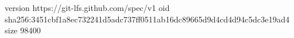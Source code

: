 version https://git-lfs.github.com/spec/v1
oid sha256:3451cbf1a8ec732241d5adc737ff0511ab16dc89665d9d4cd4d94c5dc3e19ad4
size 98400
